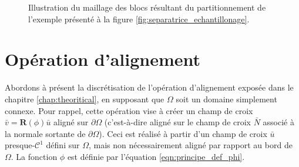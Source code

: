 \begin{figure}[h!]
\begin{subfigure}{0.49\textwidth}
    \label{fig:quad_carre}
\end{subfigure}
\caption{Illustration du maillage des blocs résultant du partitionnement de l'exemple présenté à la figure \ref{fig:separatrice_echantillonage}.}
\label{fig:maillage_quad_carre}
\end{figure}

\section{Opération d'alignement}

Abordons à présent la discrétisation de l'opération d'alignement exposée dans le chapitre \ref{chap:theoritical}, en supposant que $\Omega$ soit un domaine simplement connexe. Pour rappel, cette opération vise à créer un champ de croix $\bar{v}=\mathbf{R}(\phi)\bar{u}$ aligné sur $\partial\Omega$ (c'est-à-dire aligné sur le champ de croix $\bar{N}$ associé à la normale sortante de $\partial\Omega$). Ceci est réalisé à partir d'un champ de croix $\bar{u}$ presque-$\mathcal{C}^1$ défini sur $\Omega$, mais non nécessairement aligné par rapport au bord de $\Omega$. La fonction $\phi$ est définie par l'équation \eqref{eqn:principe_def_phi}.

